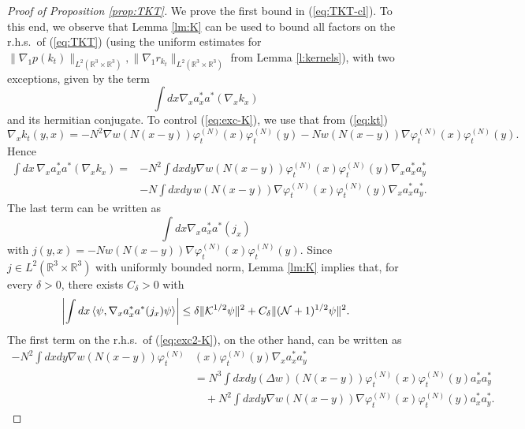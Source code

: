 \documentclass[11pt,a4paper]{article}
\newcommand{\done}{}
\newcommand{\bR}{{\mathbb R}}
\newcommand{\cK}{{\cal K}}
\newcommand{\cN}{{\cal N}}
\begin{document}
\begin{proof}[Proof of Proposition \ref{prop:TKT}] 
We prove the first bound in (\ref{eq:TKT-cl}). To this end, we observe that Lemma \ref{lm:K} can be used to bound all factors on the r.h.s.\ of (\ref{eq:TKT})  (using the uniform estimates for $\| \nabla_1 p (k_t) \|_{L^2 (\bR^3 \times \bR^3)}, \| \nabla_1 r_{k_t} \|_{L^2 (\bR^3 \times \bR^3)}$ from Lemma \ref{l:kernels}), with two exceptions, given by the term
\begin{equation}\label{eq:exc-K} \int dx \nabla_x a^*_x a^* (\nabla_x k_x) \end{equation}
and its hermitian conjugate. To control (\ref{eq:exc-K}), we use that from (\ref{eq:kt})\done
\[ \nabla_x k_t (y,x) = - N^2 \nabla w (N (x-y)) \varphi_t^{(N)} (x) \varphi_t^{(N)} (y) - N w (N (x-y)) \nabla\varphi_t^{(N)} (x) \varphi_t^{(N)} (y).  \]
Hence
\begin{equation}\label{eq:exc2-K} \begin{split} 
\int dx \, \nabla_x a_x^* a^* (\nabla_x k_x)  = &- N^2 \int dx dy \nabla w (N (x-y)) \varphi_t^{(N)} (x) \varphi_t^{(N)} (y) \nabla_x a^*_x a_y^* \\ &- N \int dx dy \, w(N (x-y)) \nabla \varphi_t^{(N)} (x) \varphi_t^{(N)} (y) \nabla_x a_x^* a_y^*.   \end{split}\end{equation}
The last term can be written as
\begin{equation} \int dx  \nabla_x a_x^* a^* (j_x) \end{equation}
with $j(y,x) = -N w(N (x-y)) \nabla \varphi_t^{(N)} (x) \varphi_t^{(N)} (y)$. Since $j \in L^2 (\bR^3 \times \bR^3)$ with uniformly bounded norm, Lemma \ref{lm:K} implies that, for every $\delta > 0$, there exists $C_\delta >0$ with
\begin{equation}\label{eq:exc3-K} \left| \int dx \, \langle \psi , \nabla_x a_x^* a^* (j_x) \psi \rangle \right| \leq \delta \| \cK^{1/2} \psi \|^2 + C_\delta \| (\cN + 1)^{1/2} \psi \|^2. \end{equation}
The first term on the r.h.s.\ of (\ref{eq:exc2-K}), on the other hand, can be written as
\[ \begin{split}
- N^2 \int dx dy \nabla w (N (x-y)) \varphi_t^{(N)} &(x) \varphi_t^{(N)} (y) \nabla_x a^*_x a_y^* \\ &=
 N^3 \int dx dy (\Delta w) (N (x-y)) \varphi_t^{(N)} (x) \varphi_t^{(N)} (y)
 a^*_x a_y^* \\ &\quad + N^2 \int dx dy \nabla w (N (x-y)) \nabla \varphi^{(N)}_t (x) \varphi_t^{(N)} (y) a_x^* a_y^*. \end{split} \]

\end{proof}
\end{document}
